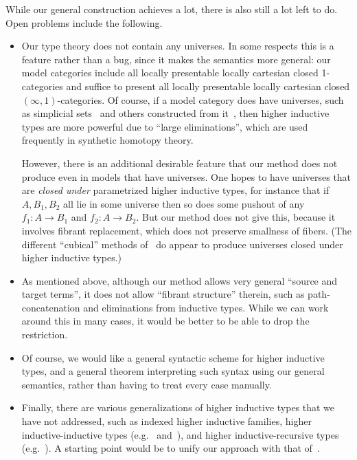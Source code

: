 While our general construction achieves a lot, there is also still a lot left to do.
Open problems include the following.
\begin{itemize}
\item Our type theory does not contain any universes.
  In some respects this is a feature rather than a bug, since it makes the semantics more general: our model categories include all locally presentable locally cartesian closed 1-categories and suffice to present all locally presentable locally cartesian closed $(\infty,1)$-categories.
  Of course, if a model category does have universes, such as simplicial sets~\cite{klv:ssetmodel} and others constructed from it~\cite{shulman:invdia,shulman:elreedy,cisinski:elegant,shulman:eiuniv}, then higher inductive types are more powerful due to ``large eliminations'', which are used frequently in synthetic homotopy theory.

  However, there is an additional desirable feature that our method does not produce even in models that have universes.
  One hopes to have universes that are \emph{closed under} parametrized higher inductive types, for instance that if $A,B_1,B_2$ all lie in some universe then so does some pushout of any $f_1:A\to B_1$ and $f_2:A\to B_2$.
  But our method does not give this, because it involves fibrant replacement, which does not preserve smallness of fibers.
  (The different ``cubical'' methods of~\cite{chm:cubical-hits} do appear to produce universes closed under higher inductive types.)
\item As mentioned above, although our method allows very general ``source and target terms'', it does not allow ``fibrant structure'' therein, such as path-concatenation and eliminations from inductive types.
  While we can work around this in many cases, it would be better to be able to drop the restriction.
\item Of course, we would like a general syntactic scheme for higher inductive types, and a general theorem interpreting such syntax using our general semantics, rather than having to treat every case manually.
\item Finally, there are various generalizations of higher inductive types that we have not addressed, such as indexed higher inductive families, higher inductive-inductive types (e.g.~\cite[Chapter 11]{hottbook} and~\cite{ak:tt-qit}), and higher inductive-recursive types (e.g.~\cite{shulman:hiru-tdd}).
  A starting point would be to unify our approach with that of~\cite{acdf:qiits}.
\end{itemize}


